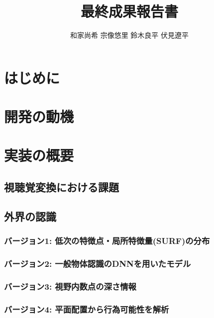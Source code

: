 \documentclass{jsarticle}
\begin{document}
 \makeatletter
    \renewcommand{\thefigure}{
    \thesection.\arabic{figure}}
  \makeatother

  \makeatletter
    \renewcommand{\thetable}{%
    \thesection.\arabic{table}}
  \makeatother

\title{最終成果報告書}
\author{和家尚希 宗像悠里 鈴木良平 伏見遼平}
\maketitle

\tableofcontents %
\thispagestyle{empty} %


\section{はじめに}
\section{開発の動機}

\section{実装の概要}
\subsection{視聴覚変換における課題}
\subsection{外界の認識}
\subsubsection{バージョン1: 低次の特徴点・局所特徴量(SURF)の分布}
\subsubsection{バージョン2: 一般物体認識のDNNを用いたモデル}
\subsubsection{バージョン3: 視野内数点の深さ情報}
\subsubsection{バージョン4: 平面配置から行為可能性を解析}
\end{document}
